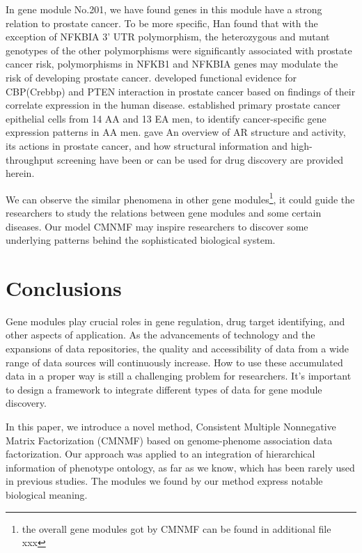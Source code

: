 \documentclass{bmcart}
\begin{document}
In gene module No.201, we have found genes in this module have a strong relation to prostate cancer. To be more specific, Han \cite{Han2015} found that with the exception of NFKBIA 3' UTR polymorphism, the heterozygous and mutant genotypes of the other polymorphisms were significantly associated with prostate cancer risk, polymorphisms in NFKB1 and NFKBIA genes may modulate the risk of developing prostate cancer. \cite{Ding2014} developed functional evidence for CBP(Crebbp) and PTEN interaction in prostate cancer based on findings of their correlate expression in the human disease.  \cite{Timofeeva2009} established primary prostate cancer epithelial cells from 14 AA and 13 EA men, to identify cancer-specific gene expression patterns in AA men.
\cite{Tan2015} gave An overview of AR structure and activity, its actions in prostate cancer, and how structural information and high-throughput screening have been or can be used for drug discovery are provided herein.


 We can observe the similar phenomena in other gene modules\footnote{the overall gene modules got by CMNMF can be found in additional file xxx}, it could guide the researchers to study the relations between gene modules and some certain diseases. Our model CMNMF may inspire researchers to discover some underlying patterns behind the sophisticated biological system.

\section*{Conclusions}
Gene modules play crucial roles in gene regulation, drug target identifying, and other aspects of application. As the advancements of technology and the expansions of data repositories, the quality and accessibility of data from a wide range of data sources will continuously increase. How to use these accumulated data in a proper way is still a challenging problem for researchers. It's important to design a framework to integrate different types of data for gene module discovery.

In this paper, we introduce a novel method, Consistent Multiple Nonnegative Matrix Factorization (CMNMF) based on genome-phenome association data factorization. Our approach was applied to an integration of hierarchical information of phenotype ontology, as far as we know, which has been rarely used in previous studies. The modules we found by our method express notable biological meaning.
\end{document}
